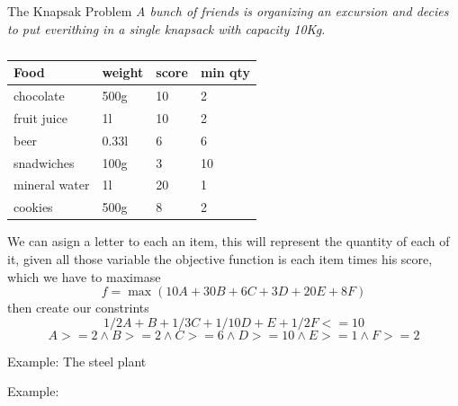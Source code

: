 \documentclass[12pt]{article}
\begin{document}
\begin{example}{The Knapsak Problem}{}
  \textit{A bunch of friends is organizing an excursion and decies to put everithing in a single knapsack with capacity 10Kg.}
\end{example}

\begin{table}[h]
  \caption{}\label{tab:}
  \begin{center}
    \begin{tabular}{l l l l}
      \hline
      Food & weight & score & min qty \\
      \hline
      chocolate & 500g & 10 & 2 \\
      fruit juice & 1l & 10 & 2 \\
      beer & 0.33l & 6 & 6 \\
      snadwiches & 100g & 3 & 10 \\
      mineral water & 1l & 20 & 1 \\
      cookies & 500g & 8 & 2 \\
      \hline
    \end{tabular}
  \end{center}
\end{table}


We can asign a letter to each an item, this will represent the quantity of each of it, given all those variable the objective function is each item times his score, which we have to maximase
\[
  f = \max{( 10 A + 30 B + 6 C + 3 D + 20 E + 8 F)}
\]
then create our constrints
\[
  1/2A + B + 1/3C + 1/10D + E + 1/2F <= 10
\]
\[
  A >= 2 \land B >= 2 \land C >= 6 \land D >= 10 \land E >= 1 \land F >= 2
\]
  

Example:
The steel plant

Example:
\end{document}

